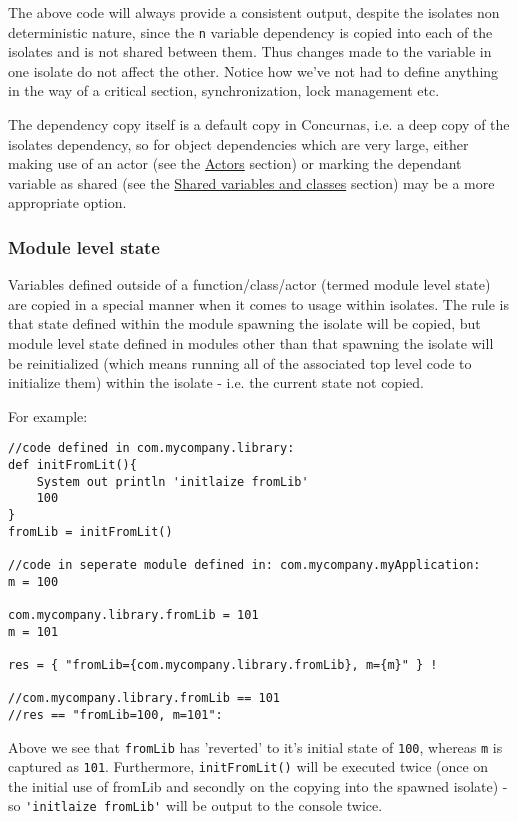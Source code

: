\documentclass[conc-doc]{subfiles}
\begin{document}
The above code will always provide a consistent output, despite the isolates non deterministic nature, since the \lstinline{n} variable dependency is copied into each of the isolates and is not shared between them. Thus changes made to the variable in one isolate do not affect the other. Notice how we've not had to define anything in the way of a critical section, synchronization, lock management etc.

The dependency copy itself is a default copy in Concurnas, i.e. a deep copy of the isolates dependency, so for object dependencies which are very large, either making use of an actor (see the \hyperref[sec:actors]{Actors} section) or marking the dependant variable as shared (see the \hyperref[sec:shared]{Shared variables and classes} section) may be a more appropriate option.

\subsubsection{Module level state}
Variables defined outside of a function/class/actor (termed module level state) are copied in a special manner when it comes to usage within isolates. The rule is that state defined within the module spawning the isolate will be copied, but module level state defined in modules other than that spawning the isolate will be reinitialized (which means running all of the associated top level code to initialize them) within the isolate - i.e. the current state not copied.

For example:

\begin{lstlisting}
//code defined in com.mycompany.library:
def initFromLit(){
	System out println 'initlaize fromLib'
	100
}
fromLib = initFromLit()

//code in seperate module defined in: com.mycompany.myApplication:
m = 100

com.mycompany.library.fromLib = 101
m = 101

res = { "fromLib={com.mycompany.library.fromLib}, m={m}" } !

//com.mycompany.library.fromLib == 101
//res == "fromLib=100, m=101":
\end{lstlisting}

Above we see that \lstinline{fromLib} has 'reverted' to it's initial state of \lstinline{100}, whereas \lstinline{m} is captured as \lstinline{101}. Furthermore, \lstinline{initFromLit()} will be executed twice (once on the initial use of fromLib and secondly on the copying into the spawned isolate) - so \lstinline{'initlaize fromLib'} will be output to the console twice.
\end{document}
